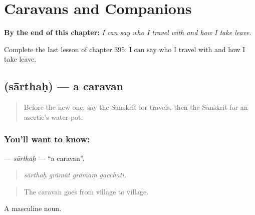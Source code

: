 
\chapter{Caravans and Companions}
\label{ch:sa-caravans-and-companions}

\begin{chapteropening}
\textbf{By the end of this chapter:} \emph{I can say who I travel with and how I take leave.}

Complete the last lesson of chapter 395: I can say who I travel with and how I take leave.
\end{chapteropening}

\section[\texorpdfstring{\sk{सार्थः} (sārthaḥ)}{सार्थः (sārthaḥ)}]{ (sārthaḥ) — a caravan}

\label{lesson:SA-C395-sarthah}



\begin{quote}
Before the new one: say the Sanskrit for travels, then the Sanskrit for an ascetic's water-pot.
\end{quote}

\subsection*{You'll want to know: }
\textbf{} — \emph{sārthaḥ} — \textquotedblleft{}a caravan\textquotedblright{}.

\begin{quote}
   
\end{quote}

\begin{quote}
\emph{sārthaḥ grāmāt grāmaṃ gacchati.}
\end{quote}

\begin{quote}
The caravan goes from village to village.
\end{quote}

A masculine noun.


